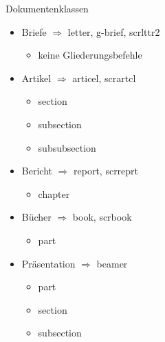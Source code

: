 \begin{frame}{Dokumentenklassen}
	\begin{itemize}[<+->]
		\item Briefe $ \Rightarrow $ letter, g-brief, scrlttr2
			\begin{itemize}[<+->]
				\item keine Gliederungsbefehle
			\end{itemize}
		\item Artikel $ \Rightarrow $ articel, scrartcl
			\begin{itemize}[<+->]
				\item section
				\item subsection
				\item subsubsection
			\end{itemize}
		\item Bericht $ \Rightarrow $ report, scrreprt
			\begin{itemize}[<+->]
				\item chapter
			\end{itemize}
		\item Bücher $ \Rightarrow $ book, scrbook
			\begin{itemize}[<+->]
				\item part
			\end{itemize}
		\item Präsentation $ \Rightarrow $ beamer
			\begin{itemize}[<+->]
				\item part
				\item section
				\item subsection
			\end{itemize}
	\end{itemize}
\end{frame}

